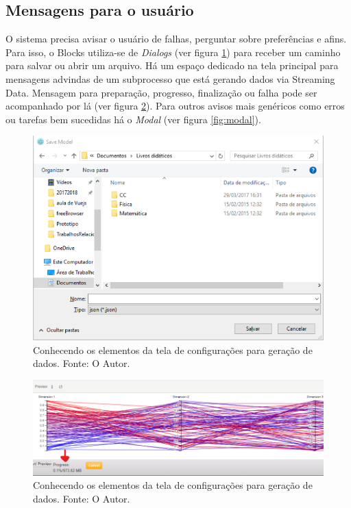 \documentclass[
	12pt,				%
	openright,			%
	twoside,			%
	a4paper,			%
	english,			%
	brazil				%
	]{abntex2}
\begin{document}
		\subsection{Mensagens para o usuário}
			O sistema precisa avisar o usuário de falhas, perguntar sobre preferências e afins.
			Para isso, o Blocks utiliza-se de \emph{Dialogs} (ver figura \ref{fig:dialog}) para receber um caminho para salvar ou abrir um arquivo.
			Há um espaço dedicado na tela principal para mensagens advindas de um subprocesso que está gerando dados via Streaming Data.
			Mensagem para preparação, progresso, finalização ou falha pode ser acompanhado por lá (ver figura \ref{fig:SDvisor}).
			Para outros avisos mais genéricos como erros ou tarefas bem sucedidas há o \emph{Modal} (ver figura \ref{fig:modal}).
			\begin{figure}[h]
				\centering
				\includegraphics[width=\linewidth]{./figures/prototipo/dialog.png}
				\caption{Conhecendo os elementos da tela de configurações para geração de dados. Fonte: O Autor.}
				\label{fig:dialog}
			\end{figure}
			\begin{figure}[h]
				\centering
				\includegraphics[width=\linewidth]{./figures/prototipo/SDvisor.png}
				\caption{Conhecendo os elementos da tela de configurações para geração de dados. Fonte: O Autor.}
				\label{fig:SDvisor}
			\end{figure}
\end{document}
